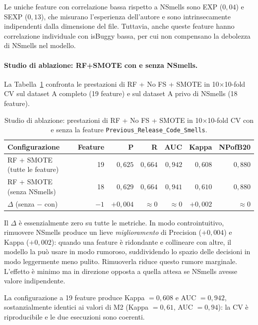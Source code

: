 Le uniche feature con correlazione bassa rispetto a NSmells sono EXP ($0{,}04$) e SEXP
($0{,}13$), che misurano l'esperienza dell'autore e sono intrinsecamente indipendenti dalla
dimensione del file. Tuttavia, anche queste feature hanno correlazione individuale con
isBuggy bassa, per cui non compensano la debolezza di NSmells nel modello.

\paragraph{Studio di ablazione: RF+SMOTE con e senza NSmells.}

La Tabella~\ref{tab:whatif_ablation} confronta le prestazioni di RF + No FS + SMOTE in
10$\times$10-fold CV sul dataset A completo (19 feature) e sul dataset A privo di NSmells
(18 feature).

\begin{table}[h]
\centering
\begin{tabular}{lrrrrrr}
\toprule
\textbf{Configurazione} & \textbf{Feature} & \textbf{P} & \textbf{R} & \textbf{AUC} & \textbf{Kappa} & \textbf{NPofB20} \\
\midrule
RF + SMOTE (tutte le feature) & 19 & $0{,}625$ & $0{,}664$ & $0{,}942$ & $0{,}608$ & $0{,}880$ \\
RF + SMOTE (senza NSmells)    & 18 & $0{,}629$ & $0{,}664$ & $0{,}941$ & $0{,}610$ & $0{,}880$ \\
\midrule
$\Delta$ (senza $-$ con)      & $-1$ & $+0{,}004$ & $\approx 0$ & $\approx 0$ & $+0{,}002$ & $\approx 0$ \\
\bottomrule
\end{tabular}
\caption{Studio di ablazione: prestazioni di RF + No FS + SMOTE in 10$\times$10-fold CV
         con e senza la feature \texttt{Previous\_Release\_Code\_Smells}.}
\label{tab:whatif_ablation}
\end{table}

Il $\Delta$ è essenzialmente zero su tutte le metriche. In modo controintuitivo, rimuovere
NSmells produce un lieve \textit{miglioramento} di Precision ($+0{,}004$) e Kappa
($+0{,}002$): quando una feature è ridondante e collineare con altre, il modello la può
usare in modo rumoroso, suddividendo lo spazio delle decisioni in modo leggermente meno
pulito. Rimuoverla riduce questo rumore marginale. L'effetto è minimo ma in direzione
opposta a quella attesa se NSmells avesse valore indipendente.

La configurazione a 19 feature produce Kappa $= 0{,}608$ e AUC $= 0{,}942$, sostanzialmente
identici ai valori di M2 (Kappa $= 0{,}61$, AUC $= 0{,}94$): la CV è riproducibile e le due
esecuzioni sono coerenti.

